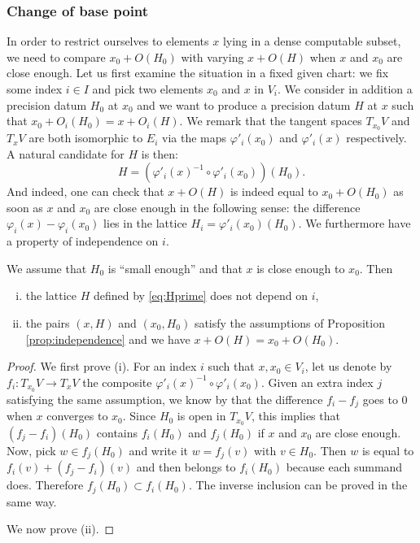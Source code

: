 \documentclass{amsart}
\begin{document}
\subsubsection*{Change of base point}

In order to restrict ourselves to elements $x$ lying in a dense 
computable subset, we need to compare $x_0 + O(H_0)$ with varying $x + 
O(H)$ when $x$ and $x_0$ are close enough.
Let us first examine the situation in a fixed given chart: we fix some 
index $i \in I$ and pick two elements $x_0$ and $x$ in $V_i$. We consider 
in addition a precision datum $H_0$ at $x_0$ and we want to produce a 
precision datum $H$ at $x$ such that $x_0 + O_i(H_0) = x + O_i(H)$. 
We remark that the tangent spaces $T_{x_0} V$ and $T_x V$ are both 
isomorphic to $E_i$ via the maps $\varphi'_i(x_0)$ and 
$\varphi'_i(x)$ respectively. A natural candidate for $H$ is then:
\begin{equation}
\label{eq:Hprime}
H = \left(\varphi'_i(x)^{-1} \circ \varphi'_i(x_0)\right) (H_0).
\end{equation}
And indeed, one can check that $x + O(H)$ is indeed equal to $x_0 + 
O(H_0)$ as soon as $x$ and $x_0$ are close enough in the following sense: 
the difference $\varphi_i(x) - \varphi_i(x_0)$ lies in the lattice $H_i = 
\varphi'_i(x_0)(H_0)$. We furthermore have a property of independence on 
$i$.

\begin{prop}
We assume that $H_0$ is ``small enough''  and that $x$ is close 
enough to $x_0$. Then
\begin{enumerate}[(i)]
\item the lattice $H$ defined by \eqref{eq:Hprime} does not depend 
on $i$,
\item the pairs $(x,H)$ and $(x_0, H_0)$ satisfy the assumptions of
Proposition \ref{prop:independence} and we have $x + O(H) = x_0 + O(H_0)$.
\end{enumerate}
\end{prop}

\begin{proof}
We first prove (i). For an index $i$ such that $x, x_0 \in V_i$, let us 
denote by $f_i : T_{x_0} V \to T_x V$ the composite $\varphi'_i(x)^{-1} 
\circ \varphi'_i(x_0)$. Given an extra index $j$ satisfying the same
assumption, we know by  that the difference
$f_i - f_j$ goes to $0$ when $x$ converges to $x_0$. Since $H_0$ is open
in $T_{x_0} V$, this implies that $(f_j - f_i)(H_0)$ contains $f_i(H_0)$ and 
$f_j(H_0)$ if $x$ and $x_0$ are close enough. Now, pick $w \in f_j(H_0)$ and 
write it $w = f_j(v)$ with $v \in H_0$. Then $w$ is equal to $f_i(v) + 
(f_j - f_i)(v)$ and then belongs to $f_i(H_0)$ because each summand does. 
Therefore $f_j(H_0) \subset f_i(H_0)$. The inverse inclusion can be proved 
in the same way.

We now prove (ii). 
\end{proof}
\end{document}
